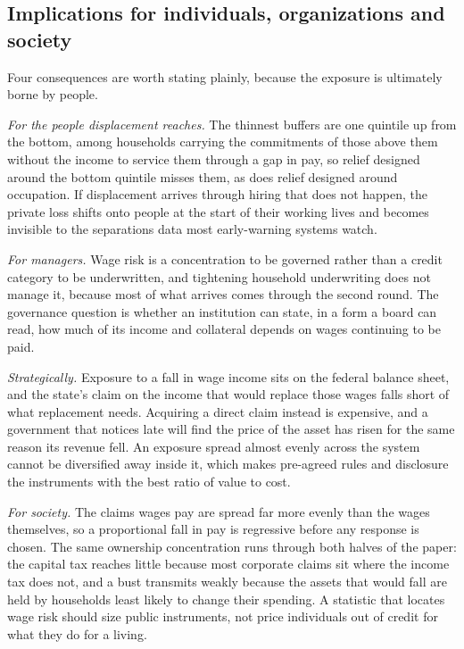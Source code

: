 \subsection{Implications for individuals, organizations and society}
\label{sec:implications}

Four consequences are worth stating plainly, because the exposure is ultimately borne by people.

\emph{For the people displacement reaches.} The thinnest buffers are one quintile up from the
bottom, among households carrying the commitments of those above them without the income to
service them through a gap in pay, so relief designed around the bottom quintile misses them, as
does relief designed around occupation. If displacement arrives through hiring that does not
happen, the private loss shifts onto people at the start of their working lives and becomes
invisible to the separations data most early-warning systems watch.

\emph{For managers.} Wage risk is a concentration to be governed rather than a credit category to
be underwritten, and tightening household underwriting does not manage it, because most of what
arrives comes through the second round. The governance question is whether an institution can
state, in a form a board can read, how much of its income and collateral depends on wages
continuing to be paid.

\emph{Strategically.} Exposure to a fall in wage income sits on the federal balance sheet, and the
state's claim on the income that would replace those wages falls short of what replacement needs.
Acquiring a direct claim instead is expensive, and a government that notices late will find the
price of the asset has risen for the same reason its revenue fell. An exposure spread almost
evenly across the system cannot be diversified away inside it, which makes pre-agreed rules and
disclosure the instruments with the best ratio of value to cost.

\emph{For society.} The claims wages pay are spread far more evenly than the wages themselves, so
a proportional fall in pay is regressive before any response is chosen. The same ownership
concentration runs through both halves of the paper: the capital tax reaches little because most
corporate claims sit where the income tax does not, and a bust transmits weakly because the assets
that would fall are held by households least likely to change their spending. A statistic that
locates wage risk should size public instruments, not price individuals out of credit for what
they do for a living.

